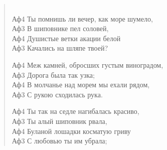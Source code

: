 \documentclass{beamer}
\begin{document}
\begin{frame}
\begin{verse}
\\
Аф4 Ты помнишь ли вечер, как море шумело,\\
Аф3 В шиповнике пел соловей,\\
Аф4 Душистые ветки акации белой\\
Аф3 Качались на шляпе твоей?

Аф4 Меж камней, обросших густым виноградом,\\
Аф3 Дорога была так узка;\\
Аф4 В молчанье над морем мы ехали рядом,\\
Аф3 С рукою сходилась рука.

Аф4 Ты так на седле нагибалась красиво,\\
Аф3 Ты алый шиповник рвала,\\
Аф4 Буланой лошадки косматую гриву\\
Аф3 С любовью ты им убрала;
\end{verse}
\end{frame}
\end{document}
